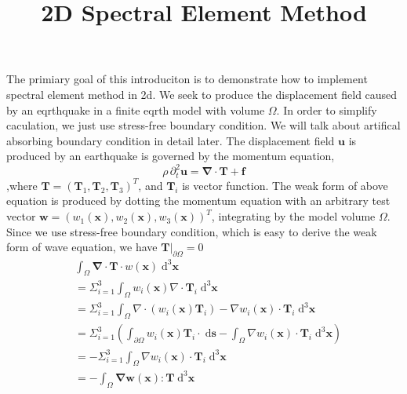 \documentclass{book}
\title{2D Spectral Element Method}
\begin{document}
  The primiary goal of this introduciton is to demonstrate how to implement spectral element method in 2d. We seek to produce the displacement field caused by an eqrthquake in a finite eqrth model with volume $\Omega$. In order to simplify caculation, we just use stress-free boundary condition.  We will  talk about artifical absorbing  boundary condition in detail later.
  The displacement field $\boldsymbol{u}$ is produced by an earthquake is governed by the momentum equation,
  \begin{equation}
  \rho\,\partial_t^2\boldsymbol{u}=\boldsymbol{\nabla}\cdot\boldsymbol{T}+\boldsymbol{f}
  \end{equation}
  ,where $\boldsymbol T =(\boldsymbol T_1,\boldsymbol T_2,\boldsymbol T_3)^T$, and $\boldsymbol T_i$ is vector function.
  The weak form of above equation is produced by dotting the momentum equation with an arbitrary test vector $\boldsymbol{w}=(w_1(\boldsymbol x),w_2(\boldsymbol x),w_3(\boldsymbol x))^T $, integrating by the model volume $\Omega$. Since we use stress-free boundary condition, which is easy to derive the weak form of wave equation, we have $\boldsymbol T|_{\partial \Omega} = 0$
  \begin{equation}
  \begin{aligned}
  &\int_\Omega \boldsymbol{\nabla}\cdot\boldsymbol{T}\cdot w(\boldsymbol{x})\;\mathrm{d}^3\boldsymbol{x}\\
  & = \Sigma _{i=1}^3\int_\Omega w_i(\boldsymbol{x})\nabla\cdot\boldsymbol{T}_i\;\mathrm{d}^3\boldsymbol{x}\\
  & = \Sigma_{i=1}^3\int_\Omega \nabla\cdot(w_i(\boldsymbol{x})\boldsymbol{T}_i) - \nabla w_i(\boldsymbol x) \cdot\boldsymbol T_i\;\mathrm{d}^3\boldsymbol{x}\\
  & = \Sigma_{i=1}^3\left(\int_{\partial\Omega} w_i(\boldsymbol{x})\boldsymbol T_i \cdot \;\mathrm{d}\boldsymbol{s}-\int_\Omega\nabla w_i(\boldsymbol x) \cdot\boldsymbol T_i\;\mathrm{d}^3\boldsymbol{x} \right)\\
  & = -\Sigma_{i=1}^3\int_\Omega\nabla w_i(\boldsymbol x) \cdot\boldsymbol T_i\;\mathrm{d}^3\boldsymbol{x}\\
  & = -\int_\Omega \boldsymbol{\nabla}\boldsymbol w(\boldsymbol x): \boldsymbol T\;\mathrm{d}^3\boldsymbol x
  \end{aligned}
  \end{equation}
\end{document}
